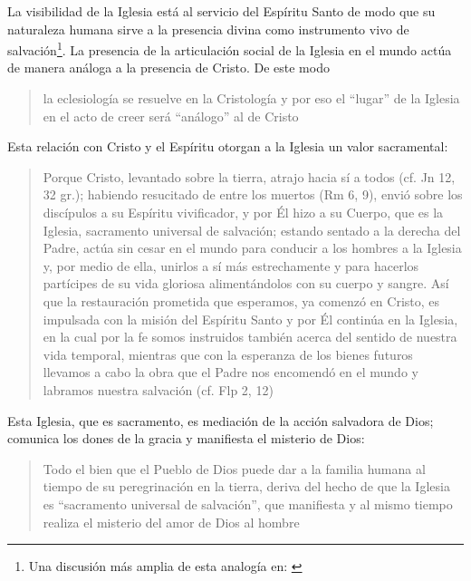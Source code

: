 La visibilidad de la Iglesia está al servicio del Espíritu Santo de modo que su naturaleza humana sirve a la presencia divina como instrumento vivo de salvación\footnote{Una discusión más amplia de esta analogía en: \cite[292-297]{ninot2009tf}}. La presencia de la articulación social de la Iglesia en el mundo actúa de manera análoga a la presencia de Cristo. De este modo \blockquote[{\cite[566]{ninot2009tf}}]{la eclesiología se resuelve en la Cristología y por eso el ``lugar'' de la Iglesia en el acto de creer será ``análogo'' al de Cristo}. Esta relación con Cristo y el Espíritu otorgan a la Iglesia un valor sacramental: \blockquote[][\,(LG 48)]{Porque Cristo, levantado sobre la tierra, atrajo hacia sí a todos (cf. Jn 12, 32 gr.); habiendo resucitado de entre los muertos (Rm 6, 9), envió sobre los discípulos a su Espíritu vivificador, y por Él hizo a su Cuerpo, que es la Iglesia, sacramento universal de salvación; estando sentado a la derecha del Padre, actúa sin cesar en el mundo para conducir a los hombres a la Iglesia y, por medio de ella, unirlos a sí más estrechamente y para hacerlos partícipes de su vida gloriosa alimentándolos con su cuerpo y sangre. Así que la restauración prometida que esperamos, ya comenzó en Cristo, es impulsada con la misión del Espíritu Santo y por Él continúa en la Iglesia, en la cual por la fe somos instruidos también acerca del sentido de nuestra vida temporal, mientras que con la esperanza de los bienes futuros llevamos a cabo la obra que el Padre nos encomendó en el mundo y labramos nuestra salvación (cf. Flp 2, 12)}. Esta Iglesia, que es sacramento, es mediación de la acción salvadora de Dios; comunica los dones de la gracia y manifiesta el misterio de Dios: \blockquote[][\,(GS 45)]{Todo el bien que el Pueblo de Dios puede dar a la familia humana al tiempo de su peregrinación en la tierra, deriva del hecho de que la Iglesia es ``sacramento universal de salvación'', que manifiesta y al mismo tiempo realiza el misterio del amor de Dios al hombre}.


